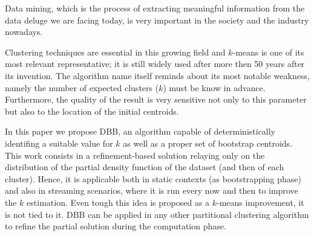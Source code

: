 Data mining, which is the process of extracting meaningful information from the data deluge we are 
facing today, is very important in the society and the industry nowadays.


Clustering techniques are essential in this growing field
and $k$-means is one of its most relevant representative; it is still widely used after more 
then 50 years after its invention.
The algorithm name itself reminds about its most notable weakness, namely the number of expected clusters 
($k$) must be know in advance. Furthermore, the quality of the result is very sensitive not only to this
parameter but also to the location of the initial centroids.


In this paper we propose DBB, an algorithm capable of
deterministically identifing a suitable value for $k$
as well as a proper set of bootstrap centroids.
This work consists in a refinement-based solution relaying only on the distribution
of the partial density function of the dataset (and then of each cluster).
Hence, it is applicable both in static contexts (as bootstrapping phase) and also in streaming scenarios,
where it is run every now and then to improve the $k$ estimation.
Even tough this idea is proposed as a $k$-means improvement,
it is not tied to it. DBB can be applied in any other partitional
clustering algorithm to refine the partial solution during the
computation phase.
